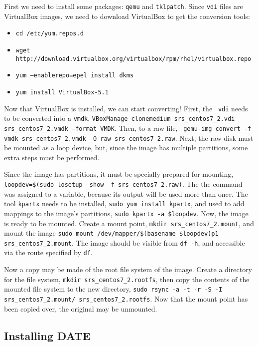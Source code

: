 \documentclass[12pt]{article}
\begin{document}
\qq First we need to install some packages: {\tt qemu} and {\tt tklpatch}.
Since {\tt vdi} files are VirtualBox images, we need to download VirtualBox to
get the conversion tools:

\begin{itemize}
  \item {\tt cd /etc/yum.repos.d}
  \item {\tt wget
      http://download.virtualbox.org/virtualbox/rpm/rhel/virtualbox.repo}
  \item {\tt yum --enablerepo=epel install dkms}
  \item {\tt yum install VirtualBox-5.1}
\end{itemize}

\qq Now that VirtualBox is installed, we can start converting! First, the {\tt
  vdi} needs to be converted into a {\tt vmdk}, {\tt VBoxManage clonemedium
  srs\_centos7\_2.vdi srs\_centos7\_2.vmdk --format VMDK}. Then, to a raw file, {\tt
  gemu-img convert -f vmdk srs\_centos7\_2.vmdk -O raw srs\_centos7\_2.raw}. Next,
the raw disk must be mounted as a loop device, but, since the image has multiple
partitions, some extra steps must be performed. 

\qq Since the image has partitions, it must be specially prepared for mounting,
{\tt loopdev=\$(sudo losetup --show -f srs\_centos7\_2.raw)}. The the command was
assigned to a variable, because its output will be used more than once. The tool
{\tt kpartx} needs to be installed, {\tt sudo yum install kpartx}, and used to
add mappings to the image's partitions, {\tt sudo kpartx -a \$loopdev}. Now, the
image is ready to be mounted. Create a mount point, {\tt mkdir
  srs\_centos7\_2.mount}, and mount the image {\tt sudo mount
  /dev/mapper/\$(basename \$loopdev)p1 srs\_centos7\_2.mount}. The image should be
visible from {\tt df -h}, and accessible via the route specified by {\tt df}.

\qq Now a copy may be made of the root file system of the image. Create a
directory for the file system, {\tt mkdir srs\_centos7\_2.rootfs}, then copy the
contents of the mounted file system to the new directory, {\tt sudo rsync -a -t -r -S
  -I srs\_centos7\_2.mount/ srs\_centos7\_2.rootfs}. Now that the mount point has
been copied over, the original may be unmounted. 

\subsection{Installing DATE}
\end{document}

